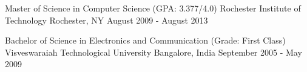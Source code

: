 

\begin{cventries}

  \cventry
    {Master of Science in Computer Science (GPA: 3.377/4.0)} %
    {Rochester Institute of Technology} %
    {Rochester, NY} %
    {August 2009 - August 2013} %
    {
    }

\vspace{\acvSectionContentTopSkip}
\vspace{-10mm}
  \cventry
    {Bachelor of Science in Electronics and Communication (Grade: First Class)} %
    {Visveswaraiah Technological University} %
    {Bangalore, India} %
    {September 2005 - May 2009}{} %
\end{cventries}
